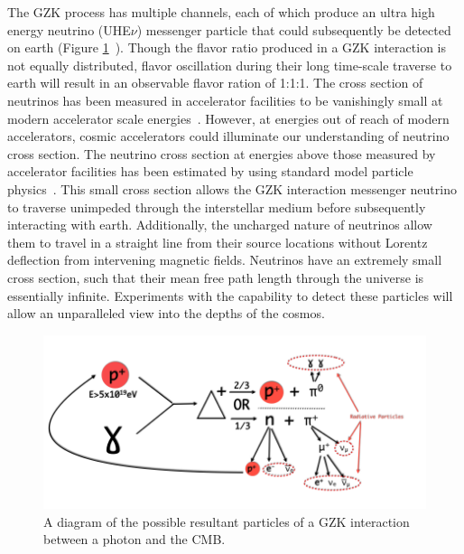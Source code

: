 		The GZK process has multiple channels, each of which produce an ultra high energy neutrino (UHE$\nu$) messenger particle that could subsequently be detected on earth (Figure \ref{fig:GZKDiagram}~\cite{GZK}).  Though the flavor ratio produced in a GZK interaction is not equally distributed, flavor oscillation during their long time-scale traverse to earth will result in an observable flavor ration of 1:1:1.  The cross section of neutrinos has been measured in accelerator facilities to be vanishingly small at modern accelerator scale energies~\cite{neutrinoCrossSectionMeasurements}.  However, at energies out of reach of modern accelerators, cosmic accelerators could illuminate our understanding of neutrino cross section.  The neutrino cross section at energies above those measured by accelerator facilities has been estimated by using standard model particle physics~\cite{neutrinoCrossSectionExtrapolation}. This small cross section allows the GZK interaction messenger neutrino to traverse unimpeded through the interstellar medium before subsequently interacting with earth.  Additionally, the uncharged nature of neutrinos allow them to travel in a straight line from their source locations without Lorentz deflection from intervening magnetic fields.  Neutrinos have an extremely small cross section, such that their mean free path length through the universe is essentially infinite. Experiments with the capability to detect these particles will allow an unparalleled view into the depths of the cosmos.

\noindent		
\begin{figure}
	\includegraphics[width=\textwidth]{figures/GZKDiagram}
	\caption{A diagram of the possible resultant particles of a GZK interaction between a photon and the CMB.}
	\label{fig:GZKDiagram}
\end{figure}
			
